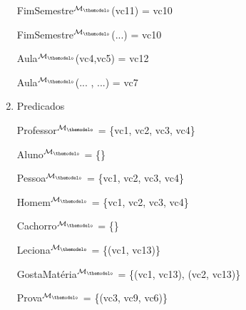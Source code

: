 \documentclass[12pt]{article}
\newcounter{const}
\newcounter{modelo}
\newcommand{\func}[3]{
    #1$^{\mathcal{M}_\themodelo}$(#2) = #3
}
\newcommand{\pred}[2]{
    #1$^{\mathcal{M}_\themodelo}$ = \{#2\}
}
\newcommand{\novoModelo}{
    \setcounter{const}{0}
    \protect\stepcounter{modelo}
}
\begin{document}
\begin{enumerate}
                \func{FimSemestre}{vc11}{vc10}
                
                \func{FimSemestre}{...}{vc10}
                
                \func{Aula}{vc4,vc5}{vc12}
                
                \func{Aula}{... , ...}{vc7}
                
            \item Predicados
                
                \pred{Professor}{vc1, vc2, vc3, vc4}
                
                \pred{Aluno}{}
                
                \pred{Pessoa}{vc1, vc2, vc3, vc4}
                
                \pred{Homem}{vc1, vc2, vc3, vc4}
            
                \pred{Cachorro}{}
                
                \pred{Leciona}{(vc1, vc13)}
                
                \pred{GostaMatéria}{(vc1, vc13), (vc2, vc13)}
                
                \pred{Prova}{(vc3, vc9, vc6)}
    
        \end{enumerate}

\end{document}
